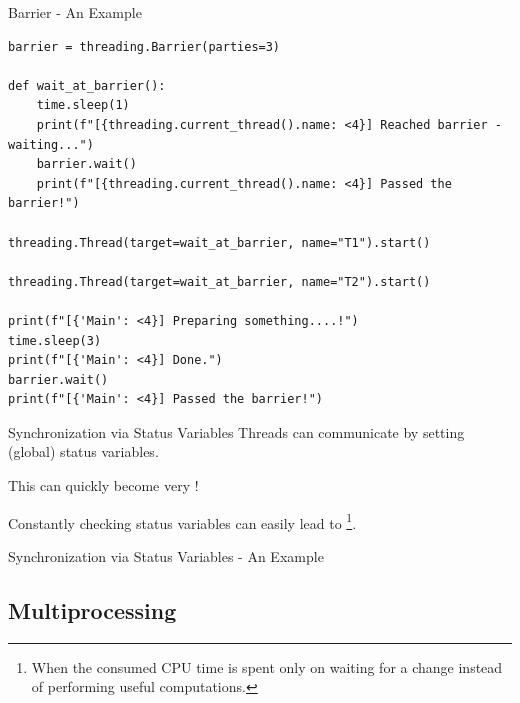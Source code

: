 \documentclass[12pt, aspectratio=169, usepdftitle=false, handout]{beamer}
\begin{document}
\begin{frame}[fragile]{Barrier - An Example}
	\begin{lstlisting}[language=pytiny]
barrier = threading.Barrier(parties=3)

def wait_at_barrier():
    time.sleep(1)
    print(f"[{threading.current_thread().name: <4}] Reached barrier - waiting...")
    barrier.wait()
    print(f"[{threading.current_thread().name: <4}] Passed the barrier!")

threading.Thread(target=wait_at_barrier, name="T1").start()

threading.Thread(target=wait_at_barrier, name="T2").start()

print(f"[{'Main': <4}] Preparing something....!")
time.sleep(3)
print(f"[{'Main': <4}] Done.")
barrier.wait()
print(f"[{'Main': <4}] Passed the barrier!")
	\end{lstlisting}
\end{frame}


\begin{frame}[fragile]{Synchronization via Status Variables}
        Threads can communicate by setting (global) status variables.

		\medskip
		
		This can quickly become very !
		
		\medskip
		
		Constantly checking status variables can easily lead to \footnote{When the consumed CPU time is spent only on waiting for a change instead of performing useful computations.}.

\end{frame}


\begin{frame}[fragile]{Synchronization via Status Variables - An Example}
	\pause
	\begin{center}
		\LARGE
	\end{center}
	
\end{frame}

{}


\subsection{Multiprocessing}
\end{document}
